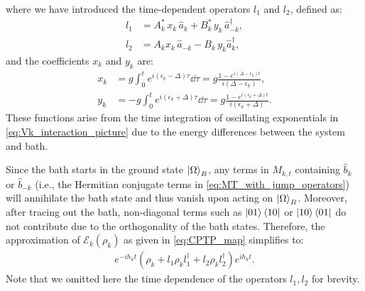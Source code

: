 where we have introduced the time-dependent operators $l_1$ and $l_2$, defined as:
\begin{align}
    l_1 &= A^*_k\, x_k\, \hat{a}_k + B^*_k\, y_k\, \hat{a}_{-k}^\dag, \label{eq:L1_def_app}\\
    l_2 &= A_k x_k\, \hat{a}_{-k} - B_k\, y_k \hat{a}_k^\dag, \label{eq:L2_def_app}
\end{align}
and the coefficients $x_k$ and $y_k$ are:
\begin{align}
    x_k &= g \int_0^t e^{i(\epsilon_k-\Delta)\tau} \dd\tau = g\frac{1 - e^{i (\Delta-\epsilon_k) t}}{i (\Delta-\epsilon_k)}, \label{eq:xT_def:app}\\
    y_k &= -g\int_0^t e^{i(\epsilon_k+\Delta)\tau} \dd\tau = g\frac{1 - e^{i (\epsilon_k + \Delta) t}}{i (\epsilon_k + \Delta)}. \label{eq:yT_def:app}
\end{align}
These functions arise from the time integration of oscillating exponentials in \cref{eq:Vk_interaction_picture} due to the energy differences between the system and bath.

Since the bath starts in the ground state $\ket{\Omega}_B$, any terms in $M_{k,t}$ containing $\hat{b}_k$ or $\hat{b}_{-k}$ (i.e., the Hermitian conjugate terms in \cref{eq:MT_with_jump_operators}) will annihilate the bath state and thus vanish upon acting on $\ket{\Omega}_B$. Moreover, after tracing out the bath, non-diagonal terms such as $\ket{01}\bra{10}$ or $\ket{10}\bra{01}$ do not contribute due to the orthogonality of the bath states. Therefore, the approximation of $\mathcal{E}_k(\rho_k)$ as given in \cref{eq:CPTP_map} simplifies to:
\begin{align}
    e^{-i h_k t} \left( \rho_k + l_1 \rho_k l_1^\dag + l_2 \rho_k l_2^\dag \right) e^{i h_k t}.
    \label{eq:nonCPTP_map}
\end{align}
Note that we omitted here the time dependence of the operators $l_1,l_2$ for brevity.

